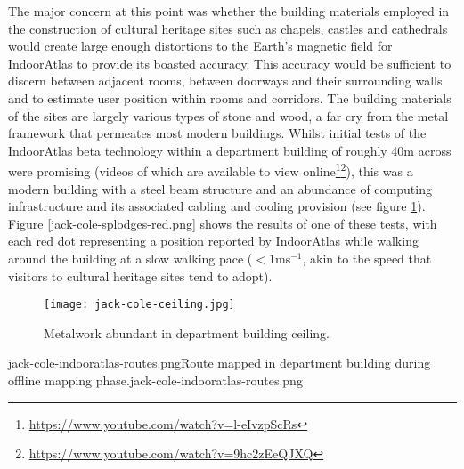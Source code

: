 The major concern at this point was whether the building materials employed in the construction of cultural heritage sites such as chapels, castles and cathedrals would create large enough distortions to the Earth's magnetic field for IndoorAtlas to provide its boasted accuracy. This accuracy would be sufficient to discern between adjacent rooms, between doorways and their surrounding walls and to estimate user position within rooms and corridors. The building materials of the sites are largely various types of stone and wood, a far cry from the metal framework that permeates most modern buildings. Whilst initial tests of the IndoorAtlas beta technology within a department building of roughly 40m across were promising (videos of which are available to view online\footnote{\url{https://www.youtube.com/watch?v=l-eIvzpScRs}}\footnote{\url{https://www.youtube.com/watch?v=9hc2zEeQJXQ}}), this was a modern building with a steel beam structure and an abundance of computing infrastructure and its associated cabling and cooling provision (see figure \ref{jack-cole-ceiling.jpg}). Figure \ref{jack-cole-splodges-red.png} shows the results of one of these tests, with each red dot representing a position reported by IndoorAtlas while walking around the building at a slow walking pace ($<1$ms$^{-1}$, akin to the speed that visitors to cultural heritage sites tend to adopt).

\begin{figure}[h]
	\begin{center}
		\texttt{[image: jack-cole-ceiling.jpg]}
		\caption{Metalwork abundant in department building ceiling.}
		\label{jack-cole-ceiling.jpg}
	\end{center}
\end{figure}

       {jack-cole-indooratlas-routes.png}{Route mapped in department building during offline mapping phase.}{jack-cole-indooratlas-routes.png}

